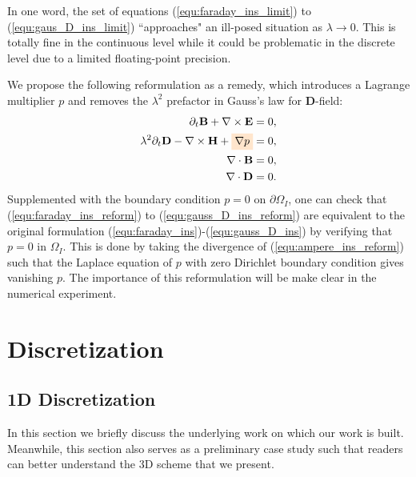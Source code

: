\documentclass{article}
\begin{document}
In one word, the set of equations (\ref{equ:faraday_ins_limit}) to (\ref{equ:gaus_D_ins_limit}) ``approaches" an ill-posed situation as $\lambda \rightarrow 0$. This is totally fine in the continuous level while it could be problematic in the discrete level due to a limited floating-point precision. 

We propose the following reformulation as a remedy, which introduces a Lagrange multiplier $p$ and removes the $\lambda^2$ prefactor in Gauss's law for $\mathbf{D}$-field:
\begin{align}
    \partial_t \mathbf{B} + \nabla \times \mathbf{E} &= 0, \label{equ:faraday_ins_reform}\\ 
    \lambda^2 \partial_t \mathbf{D} - \nabla \times \mathbf{H} + \colorbox{orange!20}{$\nabla p$} &= 0,  \label{equ:ampere_ins_reform}\\
    \nabla \cdot \mathbf{B} &= 0, \label{equ:gauss_B_ins_reform}\\
    \nabla \cdot \mathbf{D} &= 0 \label{equ:gauss_D_ins_reform}.
\end{align}
Supplemented with the boundary condition $p = 0$ on $\partial\Omega_I$, one can check that (\ref{equ:faraday_ins_reform}) to (\ref{equ:gauss_D_ins_reform}) are equivalent to the original formulation (\ref{equ:faraday_ins})-(\ref{equ:gauss_D_ins}) by verifying that $p = 0$ in $\Omega_I$. This is done by taking the divergence of (\ref{equ:ampere_ins_reform}) such that the Laplace equation of $p$ with zero Dirichlet boundary condition gives vanishing $p$. The importance of this reformulation will be make clear in the numerical experiment.

\section{Discretization}

\subsection{1D Discretization}
In this section we briefly discuss the underlying work \cite{degond_2012} on which our work is built. Meanwhile, this section also serves as a preliminary case study such that readers can better understand the 3D scheme that we present. 
\end{document}

